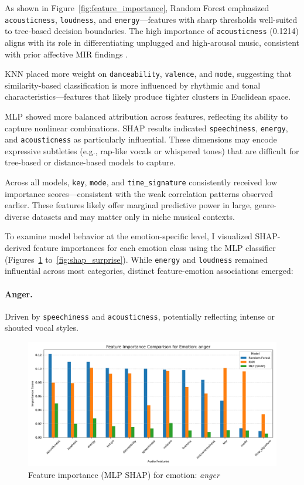 \documentclass{article}
\begin{document}
As shown in Figure~\ref{fig:feature_importance}, Random Forest emphasized \texttt{acousticness}, \texttt{loudness}, and \texttt{energy}—features with sharp thresholds well-suited to tree-based decision boundaries. The high importance of \texttt{acousticness} (0.1214) aligns with its role in differentiating unplugged and high-arousal music, consistent with prior affective MIR findings \parencite{Huron2015, McCraty1998}.

KNN placed more weight on \texttt{danceability}, \texttt{valence}, and \texttt{mode}, suggesting that similarity-based classification is more influenced by rhythmic and tonal characteristics—features that likely produce tighter clusters in Euclidean space.

MLP showed more balanced attribution across features, reflecting its ability to capture nonlinear combinations. SHAP results indicated \texttt{speechiness}, \texttt{energy}, and \texttt{acousticness} as particularly influential. These dimensions may encode expressive subtleties (e.g., rap-like vocals or whispered tones) that are difficult for tree-based or distance-based models to capture.

Across all models, \texttt{key}, \texttt{mode}, and \texttt{time\_signature} consistently received low importance scores—consistent with the weak correlation patterns observed earlier. These features likely offer marginal predictive power in large, genre-diverse datasets and may matter only in niche musical contexts.

To examine model behavior at the emotion-specific level, I visualized SHAP-derived feature importances for each emotion class using the MLP classifier (Figures~\ref{fig:shap_anger} to~\ref{fig:shap_surprise}). While \texttt{energy} and \texttt{loudness} remained influential across most categories, distinct feature-emotion associations emerged:

\paragraph{Anger.} Driven by \texttt{speechiness} and \texttt{acousticness}, potentially reflecting intense or shouted vocal styles.

\begin{figure}[H]
\centering
\includegraphics[width=0.8\linewidth]{Graphics/per_label/anger_feature_importance.png}
\caption{Feature importance (MLP SHAP) for emotion: \textit{anger}}
\label{fig:shap_anger}
\end{figure}
\end{document}
